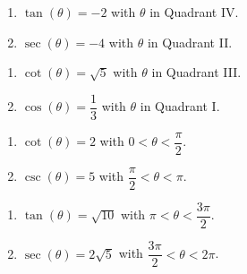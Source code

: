 \documentclass{ximera}
\begin{document}
\begin{multicols}{2}

\begin{enumerate}

\setcounter{enumi}{\value{HW}}

\item  $\tan(\theta) = -2$ with $\theta$ in Quadrant IV.
\item  $\sec(\theta) = -4$ with $\theta$ in Quadrant II.

\setcounter{HW}{\value{enumi}}

\end{enumerate}

\end{multicols}

\begin{multicols}{2}

\begin{enumerate}

\setcounter{enumi}{\value{HW}}

\item $\cot(\theta) = \sqrt{5}$ with $\theta$ in Quadrant III. 
\item  $\cos(\theta) = \dfrac{1}{3}$ with $\theta$ in Quadrant I.

\setcounter{HW}{\value{enumi}}

\end{enumerate}

\end{multicols}

\begin{multicols}{2}

\begin{enumerate}

\setcounter{enumi}{\value{HW}}

\item  $\cot(\theta) = 2$ with $0  < \theta < \dfrac{\pi}{2}$.
\item  $\csc(\theta) = 5$ with $\dfrac{\pi}{2} < \theta < \pi$.

\setcounter{HW}{\value{enumi}}

\end{enumerate}

\end{multicols}

\begin{multicols}{2}

\begin{enumerate}

\setcounter{enumi}{\value{HW}}

\item  $\tan(\theta) = \sqrt{10}$ with $\pi < \theta < \dfrac{3\pi}{2}$.
\item  $\sec(\theta) = 2\sqrt{5}$ with $\dfrac{3\pi}{2} < \theta < 2\pi$. \label{findothercirclast}

\setcounter{HW}{\value{enumi}}

\end{enumerate}

\end{multicols}
\end{document}
